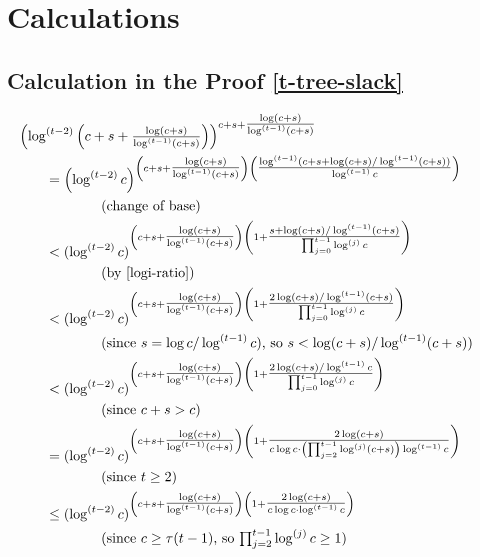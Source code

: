 \documentclass[kpfonts]{patmorin}
\theoremstyle{named}
\begin{document}
\appendix
\section{Calculations}
\label{calculation}

\subsection{Calculation in the Proof \cref{t-tree-slack}}

\begin{align*}
    &\hspace{-2em} \left(\log^{(t-2)}\left(c+s+\tfrac{\log(c+s)}{\log^{(t-1)}(c+s)}\right)\right)^{c+s+\tfrac{\log(c+s)}{\log^{(t-1)}(c+s)}} \\
    & = \left(\log^{(t-2)}c\right)^{\left(c+s+\tfrac{\log(c+s)}{\log^{(t-1)}(c+s)}\right)
        \left(\tfrac{\log^{(t-1)}(c+s+\log(c+s)/\log^{(t-1)}(c+s))}{\log^{(t-1)}c}\right)} \\
        & \qquad\qquad\text{(change of base)} \\
    & < (\log^{(t-2)}c)^{\left(c+s+\tfrac{\log(c+s)}{\log^{(t-1)}(c+s)}\right)
        \left(1 + \tfrac{s+\log(c+s)/\log^{(t-1)}(c+s)}{\prod_{j=0}^{t-1}\log^{(j)}c}\right)} \\
        & \qquad\qquad\text{(by \cref{logi-ratio})}\\
    & < (\log^{(t-2)}c)^{\left(c+s+\tfrac{\log(c+s)}{\log^{(t-1)}(c+s)}\right)
        \left(1 + \tfrac{2\log(c+s)/\log^{(t-1)}(c+s)}{\prod_{j=0}^{t-1}\log^{(j)}c}\right)} \\
        & \qquad\qquad\text{(since $s=\log c/\log^{(t-1)} c$), so $s<\log(c+s)/\log^{(t-1)}(c+s)$)}\\
    & < (\log^{(t-2)}c)^{\left(c+s+\tfrac{\log(c+s)}{\log^{(t-1)}(c+s)}\right)
        \left(1 + \tfrac{2\log(c+s)/\log^{(t-1)}c}{\prod_{j=0}^{t-1}\log^{(j)}c}\right)} \\
        & \qquad\qquad\text{(since $c+s>c$)}\\
    & = (\log^{(t-2)}c)^{\left(c+s+\tfrac{\log(c+s)}{\log^{(t-1)}(c+s)}\right)
        \left(1 + \tfrac{2\log(c+s)}{c\log c\cdot\left(\prod_{j=2}^{t-1}\log^{(j)}(c+s)\right)\log^{(t-1)}c}\right)} \\
        & \qquad\qquad\text{(since $t\ge 2$)}\\
    & \le (\log^{(t-2)}c)^{\left(c+s+\tfrac{\log(c+s)}{\log^{(t-1)}(c+s)}\right)
        \left(1 + \tfrac{2\log(c+s)}{c\log c\cdot\log^{(t-1)}c}\right)} \\            & \qquad\qquad\text{(since $c\ge \tau(t-1)$, so $\textstyle \prod_{j=2}^{t-1}\log^{(j)}c\ge 1$)} \\

\end{align*}
\end{document}
